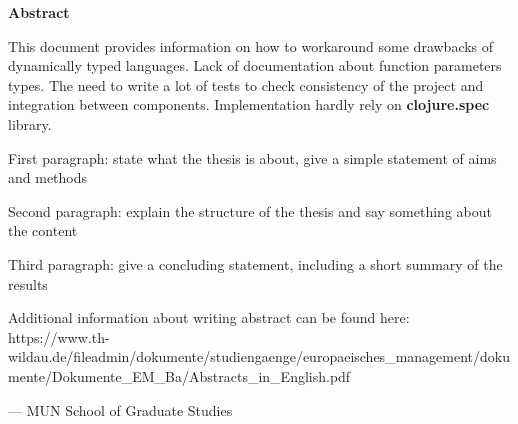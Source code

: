 \begin{center}
\textbf{\large Abstract}
\end{center}

This document provides information on how to workaround some drawbacks of
dynamically typed languages. Lack of documentation about function parameters
types. The need to write a lot of tests to check consistency of the project and
integration between components. Implementation hardly rely on
\textbf{clojure.spec} library.

First paragraph: state what the thesis is about, give a simple statement of aims and
methods

Second paragraph: explain the structure of the thesis and say something about the
content

Third paragraph: give a concluding statement, including a short summary of the
results

Additional information about writing abstract can be found here: \\
https://www.th-wildau.de/fileadmin/dokumente/studiengaenge/europaeisches_management/dokumente/Dokumente_EM_Ba/Abstracts_in_English.pdf

\vspace{1cm}


\hfill --- MUN School of Graduate Studies
